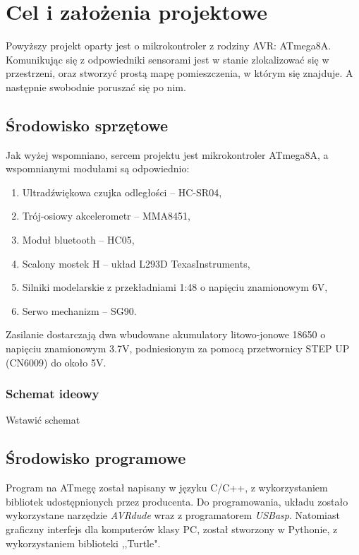 \section{Cel i założenia projektowe}
    \tab Powyższy projekt oparty jest o mikrokontroler z rodziny AVR: ATmega8A.
    Komunikując się z odpowiedniki sensorami jest w stanie zlokalizować się w przestrzeni,
    oraz stworzyć prostą mapę pomieszczenia, w którym się znajduje. A następnie swobodnie poruszać się po nim.

    \subsection{Środowisko sprzętowe}
        \tab Jak wyżej wspomniano, sercem projektu jest mikrokontroler ATmega8A, a wspomnianymi modułami są odpowiednio:
        \begin{enumerate}
            \item Ultradźwiękowa czujka odległości -- HC-SR04,
            \item Trój-osiowy akcelerometr -- MMA8451,
            \item Moduł bluetooth -- HC05,
            \item Scalony mostek H -- układ L293D TexasInstruments,
            \item Silniki modelarskie z przekładniami 1:48 o napięciu znamionowym 6V,
            \item Serwo mechanizm -- SG90.
        \end{enumerate}
% 
        Zasilanie dostarczają dwa wbudowane akumulatory litowo-jonowe 18650 o napięciu znamionowym 3.7V, podniesionym za pomocą przetwornicy STEP UP (CN6009) do około 5V.


        \subsubsection{Schemat ideowy}
            Wstawić schemat
        
    \subsection{Środowisko programowe}
        \tab Program na ATmegę został napisany w języku C/C++, z wykorzystaniem bibliotek udostępnionych przez producenta.
        Do programowania, układu zostało wykorzystane narzędzie \textit{AVRdude} wraz z programatorem \textit{USBasp}.
        Natomiast graficzny interfejs dla komputerów klasy PC, został stworzony w Pythonie, z wykorzystaniem biblioteki ,,Turtle".

